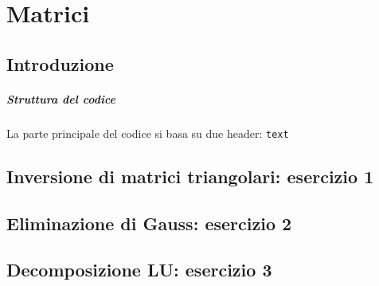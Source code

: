\setchapterpreamble[u]{\margintoc}
\chapter{Matrici}

\section{Introduzione}

\paragraph{Struttura del codice}

La parte principale del codice si basa su due header: \texttt{text}

\section{Inversione di matrici triangolari: esercizio 1}

\section{Eliminazione di Gauss: esercizio 2}

\section{Decomposizione LU: esercizio 3}

